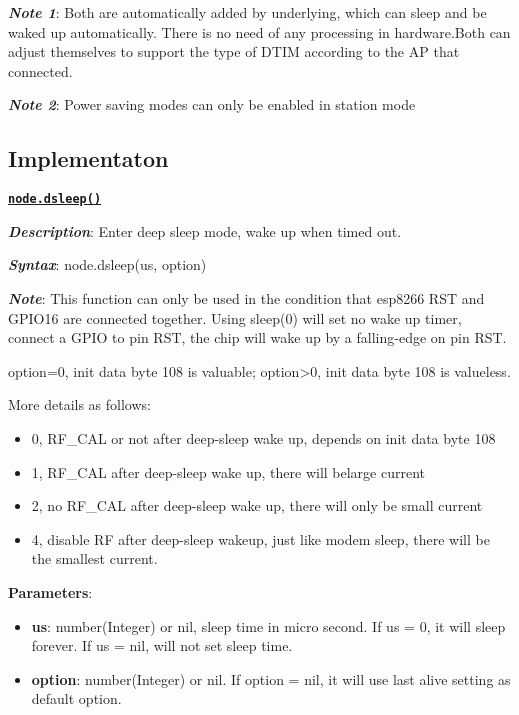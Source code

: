 \documentclass[16pt]{article}
\begin{document}
\vspace{0.2cm}

\textbf{\emph{Note 1}}: Both are automatically added by underlying, which
can sleep and be waked up automatically. There is no need of any
processing in hardware.Both can adjust themselves to support the type of
DTIM according to the AP that connected.

\vspace{0.1cm}

\textbf{\emph{Note 2}}: Power saving modes can only be enabled in station
mode

\vspace{0.6cm}

\subsection{Implementaton}

\vspace{0.3cm}

{\underline{\texttt{\textbf{node.dsleep()}}}}

\vspace{0.3cm}

\textbf{\emph{Description}}: Enter deep sleep mode, wake up when timed out.

\textbf{\emph{Syntax}}: node.dsleep(us, option)

\textbf{\emph{Note}}: This function can only be used in the condition that
esp8266 RST and GPIO16 are connected together. Using sleep(0) will set
no wake up timer, connect a GPIO to pin RST, the chip will wake up by a
falling-edge on pin RST.

option=0, init data byte 108 is valuable; option\textgreater{}0, init
data byte 108 is valueless.

More details as follows: 
\begin{itemize}
\item 0, RF\_CAL or not after deep-sleep wake up, depends on init data byte 108
\item 1, RF\_CAL after deep-sleep wake up, there will belarge current
\item 2, no RF\_CAL after deep-sleep wake up, there will only be small current 
\item 4, disable RF after deep-sleep wakeup, just like modem sleep, there will be the smallest current.
\end{itemize}

\textbf{Parameters}:

\begin{itemize}

\item
  \textbf{us}: number(Integer) or nil, sleep time in micro second. If us
  = 0, it will sleep forever. If us = nil, will not set sleep time.
\item
  \textbf{option}: number(Integer) or nil. If option = nil, it will use
  last alive setting as default option.
\end{itemize}
\end{document}

